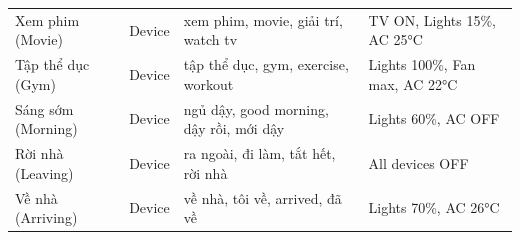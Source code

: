 \begin{table}[H]
\begin{tabularx}{\textwidth}{@{} l l >{\RaggedRight\arraybackslash}X >{\RaggedRight\arraybackslash}p{3.4cm} @{}}
Xem phim (Movie)   & Device & xem phim, movie, giải trí, watch tv               & TV ON, Lights 15\%, AC 25°C \\
Tập thể dục (Gym)  & Device & tập thể dục, gym, exercise, workout                & Lights 100\%, Fan max, AC 22°C \\
Sáng sớm (Morning) & Device & ngủ dậy, good morning, dậy rồi, mới dậy          & Lights 60\%, AC OFF \\
Rời nhà (Leaving)  & Device & ra ngoài, đi làm, tắt hết, rời nhà               & All devices OFF \\
Về nhà (Arriving)  & Device & về nhà, tôi về, arrived, đã về                    & Lights 70\%, AC 26°C \\
\bottomrule
\end{tabularx}
\end{table}

